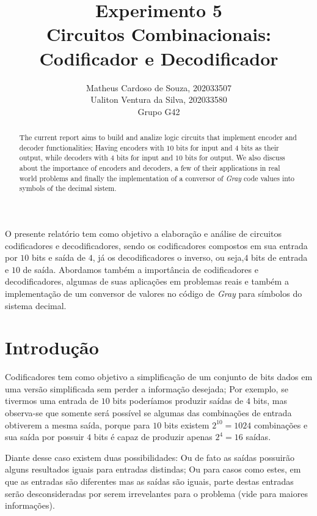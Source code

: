 \documentclass[12pt]{article}
\title{Experimento 5\\
Circuitos Combinacionais: Codificador e Decodificador}
\author{Matheus Cardoso de Souza, 202033507\\
        Ualiton Ventura da Silva, 202033580\\
        Grupo G42
}
\begin{document}
\maketitle

 \begin{abstract}
   The current report aims to build and analize logic circuits that implement
   encoder and decoder functionalities; Having encoders with $10$ bits for input
   and $4$ bits as their output, while decoders with $4$ bits for input and $10$
   bits for output. We also discuss about the importance of encoders and
   decoders, a few of their applications in real world problems and finally the
   implementation of a conversor of \emph{Gray} code values into symbols of the
   decimal sistem.
 \end{abstract}

 \begin{resumo}
   O presente relatório tem como objetivo a elaboração e análise de circuitos
   codificadores e decodificadores, sendo os codificadores compostos em sua
   entrada por $10$ bits e saída de $4$, já os decodificadores o inverso, ou
   seja,$4$ bits de entrada e $10$ de saída. Abordamos também a importância de
   codificadores e decodificadores, algumas de suas aplicações em problemas
   reais e também a implementação de um conversor de valores no código de
   \emph{Gray} para símbolos do sistema decimal.
 \end{resumo}


\section{Introdução}
\label{sec:Introducao}


Codificadores tem como objetivo a simplificação de um conjunto de bits dados em
uma versão simplificada sem perder a informação desejada; Por exemplo, se
tivermos uma entrada de $10$ bits poderíamos produzir saídas de $4$ bits, mas
observa-se que somente será possível se algumas das combinações de entrada
obtiverem a mesma saída, porque para $10$ bits existem $2^{10} = 1024$
combinações e sua saída por possuir $4$ bits é capaz de produzir apenas
$2^{4} = 16$ saídas. \cite{codificadores_mandelli}

Diante desse caso existem duas possibilidades: Ou de fato as saídas possuirão
alguns resultados iguais para entradas distindas; Ou para casos como estes, em
que as entradas são diferentes mas as saídas são iguais, parte destas entradas
serão desconsideradas por serem irrevelantes para o problema (vide
\cite{codificadores_e_decodificadores} para maiores informações).
\end{document}
